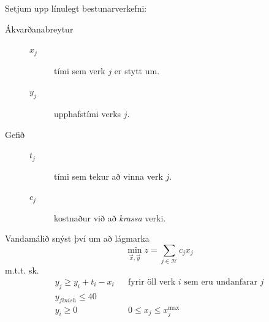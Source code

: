 \begin{lausn}
Setjum upp línulegt bestunarverkefni:
\begin{description}
 \item[Ákvarðanabreytur]\hspace{.1cm}
\begin{description}
\item[$x_j$] tími sem verk $j$ er stytt um.
\item[$y_j$] upphafstími verks $j$.
\end{description}
\item[Gefið]\hspace{.1cm}
\begin{description}
 \item[$t_j$] tími sem tekur að vinna verk $j$.
 \item[$c_j$] kostnaður við að \emph{krassa} verki.
\end{description}
\end{description}
Vandamálið snýst því um að lágmarka 
$$ \min_{\vec{x},\vec{y}} z= \sum_{j\in\mathcal{H}} c_jx_j $$
m.t.t. sk.
\begin{eqnarray*}
 y_j\geq y_i+t_i-x_i &&\mbox{fyrir öll verk } i \mbox{ sem eru undanfarar }j\\
 y_{finish}\leq 40 \\ y_i\geq0 && 0\leq x_j\leq x_j^{\max} 
\end{eqnarray*}
\end{lausn}

